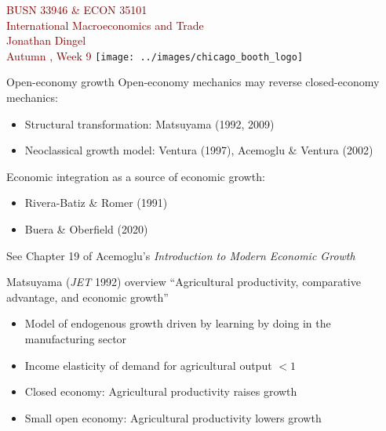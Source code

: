 \documentclass[10pt,notes=hide]{beamer}
\begin{document}
\begin{frame}[plain]
\begin{center}
\large
\textcolor{maroon}{BUSN 33946 \& ECON 35101\\
International Macroeconomics and Trade\\ 
Jonathan Dingel\\
Autumn \the\year, Week 9}
\vfill 
\texttt{[image: ../images/chicago\_booth\_logo]}
\end{center}
\end{frame}
\begin{frame}{Open-economy growth}
Open-economy mechanics may reverse closed-economy mechanics:
\begin{itemize}
\item Structural transformation: Matsuyama (1992, 2009)
\item Neoclassical growth model: Ventura (1997), Acemoglu \& Ventura (2002)
\end{itemize}
\vspace{5mm}
Economic integration as a source of economic growth:
\begin{itemize}
\item Rivera-Batiz \& Romer (1991) \item Buera \& Oberfield (2020)
\end{itemize}
\vspace{1cm}
See Chapter 19 of Acemoglu's \textit{Introduction to Modern Economic Growth}
\end{frame}
\begin{frame}{Matsuyama (\textit{JET} 1992) overview}
{\small ``Agricultural productivity, comparative advantage, and economic growth''}
\begin{itemize}
\item Model of endogenous growth driven by learning by doing in the manufacturing sector
\item Income elasticity of demand for agricultural output $<1$
\item Closed economy: Agricultural productivity raises growth
\item Small open economy: Agricultural productivity lowers growth
\end{itemize}
\end{frame}
\end{document}
